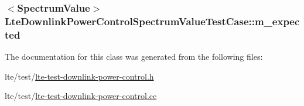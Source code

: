 \subsubsection[{\texorpdfstring{m\+\_\+expected}{m_expected}}]{$<${\bf Spectrum\+Value}$>$ Lte\+Downlink\+Power\+Control\+Spectrum\+Value\+Test\+Case\+::m\+\_\+expected\hspace{0.3cm}{\ttfamily [private]}}\hypertarget{classLteDownlinkPowerControlSpectrumValueTestCase_a6615e7aab6c6d83be1dd11c5d4b797ef}{}\label{classLteDownlinkPowerControlSpectrumValueTestCase_a6615e7aab6c6d83be1dd11c5d4b797ef}


The documentation for this class was generated from the following files\+:\begin{DoxyCompactItemize}
\item 
lte/test/\hyperlink{lte-test-downlink-power-control_8h}{lte-\/test-\/downlink-\/power-\/control.\+h}\item 
lte/test/\hyperlink{lte-test-downlink-power-control_8cc}{lte-\/test-\/downlink-\/power-\/control.\+cc}\end{DoxyCompactItemize}
